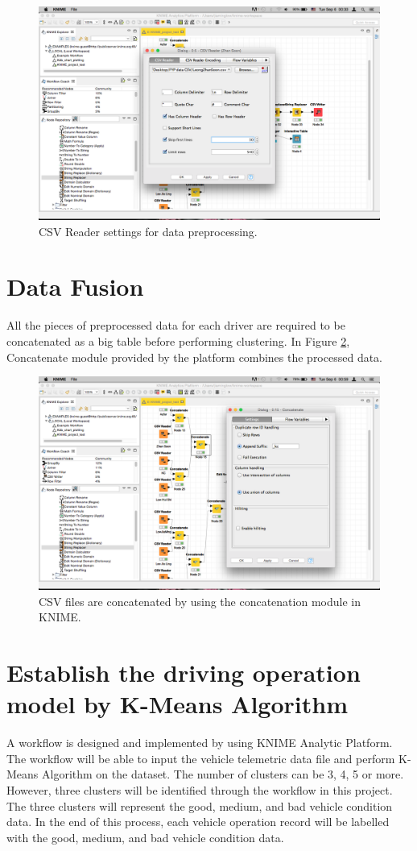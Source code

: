 \begin{figure}[hbt!]\centering
\includegraphics[width=.75\textwidth]{image/datapreprocessing}
\caption{CSV Reader settings for data preprocessing.}
\label{fig:preprocess}
\end{figure}

\section{Data Fusion}
All the pieces of preprocessed data for each driver are required to be concatenated as a big table before performing clustering. In Figure \ref{fig:KNIMEfile}, Concatenate module provided by the platform combines the processed data.

\begin{figure}[hbt!]\centering
\includegraphics[width=.75\textwidth]{image/KNIMEconcatenate}
\caption{CSV files are concatenated by using the concatenation module in KNIME.}
\label{fig:KNIMEfile}
\end{figure}

\section{Establish the driving operation model by K-Means Algorithm}
A workflow is designed and implemented by using KNIME Analytic Platform. The workflow will be able to input the vehicle telemetric data file and perform K-Means Algorithm on the dataset. The number of clusters can be 3, 4, 5 or more. However, three clusters will be identified through the workflow in this project. The three clusters will represent the good, medium, and bad vehicle condition data. In the end of this process, each vehicle operation record will be labelled with the good, medium, and bad vehicle condition data.

